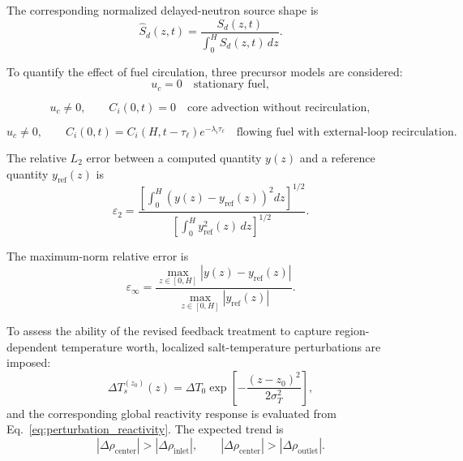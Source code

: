 \documentclass[a4paper,12pt]{article}
\begin{document}
The corresponding normalized delayed-neutron source shape is
\begin{equation}
\widehat{S}_d(z,t)
=
\frac{
S_d(z,t)
}{
\displaystyle
\int_{0}^{H}
S_d(z,t)\,dz
}.
\label{eq:normalized_delayed_source}
\end{equation}

To quantify the effect of fuel circulation, three precursor models are
considered:
\begin{equation}
u_c=0
\quad
\text{stationary fuel},
\label{eq:stationary_fuel_case}
\end{equation}

\begin{equation}
u_c\neq 0,
\qquad
C_i(0,t)=0
\quad
\text{core advection without recirculation},
\label{eq:advection_no_recirculation_case}
\end{equation}

\begin{equation}
u_c\neq 0,
\qquad
C_i(0,t)=C_i(H,t-\tau_\ell)e^{-\lambda_i\tau_\ell}
\quad
\text{flowing fuel with external-loop recirculation}.
\label{eq:advection_recirculation_case}
\end{equation}

The relative $L_2$ error between a computed quantity $y(z)$ and a
reference quantity $y_{\mathrm{ref}}(z)$ is
\begin{equation}
\varepsilon_{2}
=
\frac{
\left[
\displaystyle
\int_{0}^{H}
\left(
y(z)-y_{\mathrm{ref}}(z)
\right)^2 dz
\right]^{1/2}
}
{
\left[
\displaystyle
\int_{0}^{H}
y_{\mathrm{ref}}^{2}(z)\,dz
\right]^{1/2}
}.
\label{eq:l2_error}
\end{equation}

The maximum-norm relative error is
\begin{equation}
\varepsilon_{\infty}
=
\frac{
\max_{z\in[0,H]}
\left|
y(z)-y_{\mathrm{ref}}(z)
\right|
}
{
\max_{z\in[0,H]}
\left|
y_{\mathrm{ref}}(z)
\right|
}.
\label{eq:linf_error}
\end{equation}

To assess the ability of the revised feedback treatment to capture
region-dependent temperature worth, localized salt-temperature
perturbations are imposed:
\begin{equation}
\Delta T_s^{(z_0)}(z)
=
\Delta T_0
\exp
\left[
-\frac{(z-z_0)^2}{2\sigma_T^2}
\right],
\label{eq:localized_temperature_perturbation}
\end{equation}
and the corresponding global reactivity response is evaluated from
Eq.~\eqref{eq:perturbation_reactivity}. The expected trend is
\begin{equation}
\left|
\Delta\rho_{\mathrm{center}}
\right|
>
\left|
\Delta\rho_{\mathrm{inlet}}
\right|,
\qquad
\left|
\Delta\rho_{\mathrm{center}}
\right|
>
\left|
\Delta\rho_{\mathrm{outlet}}
\right|.
\label{eq:temperature_worth_trend}
\end{equation}
\end{document}
